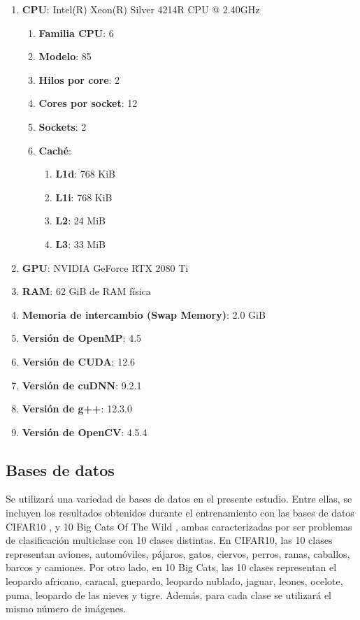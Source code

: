 \begin{enumerate}[label=\textbullet, nosep]
	\item \textbf{CPU}: Intel(R) Xeon(R) Silver 4214R CPU @ 2.40GHz
	\begin{enumerate}[label=\textbullet, nosep]
		\item \textbf{Familia CPU}: 6
		\item \textbf{Modelo}: 85
		\item \textbf{Hilos por core}: 2
		\item \textbf{Cores por socket}: 12
		\item \textbf{Sockets}: 2
		\item \textbf{Caché}:
		\begin{enumerate}[label=\textbullet, nosep]
			\item \textbf{L1d}: 768 KiB
			\item \textbf{L1i}: 768 KiB
			\item \textbf{L2}:  24 MiB
			\item \textbf{L3}:  33 MiB
		\end{enumerate}
	\end{enumerate}
	\item \textbf{GPU}: NVIDIA GeForce RTX 2080 Ti
	\item \textbf{RAM}: 62 GiB de RAM física
	\item \textbf{Memoria de intercambio (Swap Memory)}: 2.0 GiB
	\item \textbf{Versión de OpenMP}: 4.5
	\item \textbf{Versión de CUDA}: 12.6
	\item \textbf{Versión de cuDNN}: 9.2.1
	\item \textbf{Versión de g++}: 12.3.0
	\item \textbf{Versión de OpenCV}: 4.5.4
\end{enumerate}

\subsection{Bases de datos}

Se utilizará una variedad de bases de datos en el presente estudio. Entre ellas, se incluyen los resultados obtenidos durante el entrenamiento con las bases de datos CIFAR10 \cite{cifar10}, y 10 Big Cats Of The Wild \cite{10_big_cats}, ambas caracterizadas por ser problemas de clasificación multiclase con 10 clases distintas. En CIFAR10, las 10 clases representan aviones, automóviles, pájaros, gatos, ciervos, perros, ranas, caballos, barcos y camiones. Por otro lado, en 10 Big Cats, las 10 clases representan el leopardo africano, caracal, guepardo, leopardo nublado, jaguar, leones, ocelote, puma, leopardo de las nieves y tigre. Además, para cada clase se utilizará el mismo número de imágenes.

